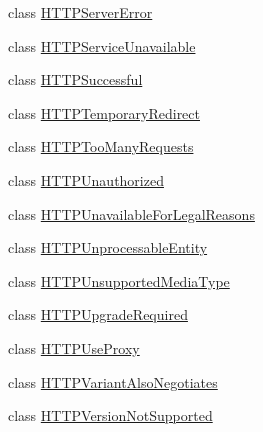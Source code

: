\begin{DoxyCompactItemize}
class \hyperlink{classaiohttp_1_1web__exceptions_1_1_h_t_t_p_server_error}{H\+T\+T\+P\+Server\+Error}
\item 
class \hyperlink{classaiohttp_1_1web__exceptions_1_1_h_t_t_p_service_unavailable}{H\+T\+T\+P\+Service\+Unavailable}
\item 
class \hyperlink{classaiohttp_1_1web__exceptions_1_1_h_t_t_p_successful}{H\+T\+T\+P\+Successful}
\item 
class \hyperlink{classaiohttp_1_1web__exceptions_1_1_h_t_t_p_temporary_redirect}{H\+T\+T\+P\+Temporary\+Redirect}
\item 
class \hyperlink{classaiohttp_1_1web__exceptions_1_1_h_t_t_p_too_many_requests}{H\+T\+T\+P\+Too\+Many\+Requests}
\item 
class \hyperlink{classaiohttp_1_1web__exceptions_1_1_h_t_t_p_unauthorized}{H\+T\+T\+P\+Unauthorized}
\item 
class \hyperlink{classaiohttp_1_1web__exceptions_1_1_h_t_t_p_unavailable_for_legal_reasons}{H\+T\+T\+P\+Unavailable\+For\+Legal\+Reasons}
\item 
class \hyperlink{classaiohttp_1_1web__exceptions_1_1_h_t_t_p_unprocessable_entity}{H\+T\+T\+P\+Unprocessable\+Entity}
\item 
class \hyperlink{classaiohttp_1_1web__exceptions_1_1_h_t_t_p_unsupported_media_type}{H\+T\+T\+P\+Unsupported\+Media\+Type}
\item 
class \hyperlink{classaiohttp_1_1web__exceptions_1_1_h_t_t_p_upgrade_required}{H\+T\+T\+P\+Upgrade\+Required}
\item 
class \hyperlink{classaiohttp_1_1web__exceptions_1_1_h_t_t_p_use_proxy}{H\+T\+T\+P\+Use\+Proxy}
\item 
class \hyperlink{classaiohttp_1_1web__exceptions_1_1_h_t_t_p_variant_also_negotiates}{H\+T\+T\+P\+Variant\+Also\+Negotiates}
\item 
class \hyperlink{classaiohttp_1_1web__exceptions_1_1_h_t_t_p_version_not_supported}{H\+T\+T\+P\+Version\+Not\+Supported}
\end{DoxyCompactItemize}
